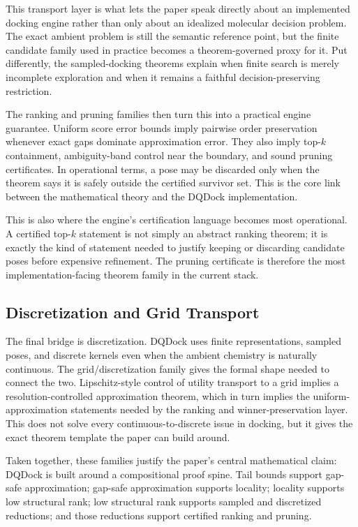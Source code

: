 This transport layer is what lets the paper speak directly about an implemented docking engine rather than only about an idealized molecular decision problem. The exact ambient problem is still the semantic reference point, but the finite candidate family used in practice becomes a theorem-governed proxy for it. Put differently, the sampled-docking theorems explain when finite search is merely incomplete exploration and when it remains a faithful decision-preserving restriction.

The ranking and pruning families  then turn this into a practical engine guarantee. Uniform score error bounds imply pairwise order preservation whenever exact gaps dominate approximation error. They also imply top-$k$ containment, ambiguity-band control near the boundary, and sound pruning certificates. In operational terms, a pose may be discarded only when the theorem says it is safely outside the certified survivor set. This is the core link between the mathematical theory and the DQDock implementation.

This is also where the engine's certification language becomes most operational. A certified top-$k$ statement is not simply an abstract ranking theorem; it is exactly the kind of statement needed to justify keeping or discarding candidate poses before expensive refinement. The pruning certificate is therefore the most implementation-facing theorem family in the current stack.

\subsection{Discretization and Grid Transport}

The final bridge is discretization. DQDock uses finite representations, sampled poses, and discrete kernels even when the ambient chemistry is naturally continuous. The grid/discretization family  gives the formal shape needed to connect the two. Lipschitz-style control of utility transport to a grid implies a resolution-controlled approximation theorem, which in turn implies the uniform-approximation statements needed by the ranking and winner-preservation layer. This does not solve every continuous-to-discrete issue in docking, but it gives the exact theorem template the paper can build around.

Taken together, these families justify the paper's central mathematical claim: DQDock is built around a compositional proof spine. Tail bounds support gap-safe approximation; gap-safe approximation supports locality; locality supports low structural rank; low structural rank supports sampled and discretized reductions; and those reductions support certified ranking and pruning.
